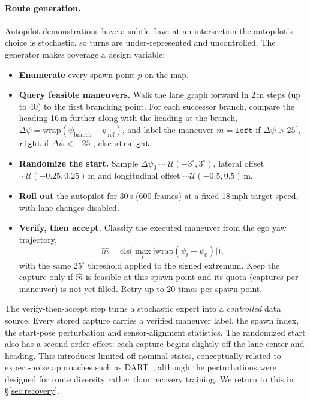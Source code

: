 \documentclass[11pt]{article}
\begin{document}
\paragraph{Route generation.} Autopilot demonstrations have a subtle flaw: at an intersection the autopilot's choice is stochastic, so turns are under-represented and uncontrolled. The generator makes coverage a design variable:
\begin{itemize}
  \item \textbf{Enumerate} every spawn point $p$ on the map.
  \item \textbf{Query feasible maneuvers.} Walk the lane graph forward in 2\,m steps (up to 40) to the first branching point. For each successor branch, compare the heading 16\,m further along with the heading at the branch, $\Delta\psi = \mathrm{wrap}(\psi_{\text{branch}} - \psi_{\text{ref}})$, and label the maneuver $m = \texttt{left}$ if $\Delta\psi > 25^\circ$, $\texttt{right}$ if $\Delta\psi < -25^\circ$, else $\texttt{straight}$.
  \item \textbf{Randomize the start.} Sample $\Delta\psi_0\sim\mathcal U(-3^\circ, 3^\circ)$, lateral offset $\sim\mathcal U(-0.25, 0.25)$\,m and longitudinal offset $\sim\mathcal U(-0.5, 0.5)$\,m.
  \item \textbf{Roll out} the autopilot for 30\,s (600 frames) at a fixed 18\,mph target speed, with lane changes disabled.
  \item \textbf{Verify, then accept.} Classify the executed maneuver from the ego yaw trajectory,
  \[ \hat m = \mathrm{cls}\Big(\max_t \big|\mathrm{wrap}(\psi_t - \psi_0)\big|\Big), \]
  with the same $25^\circ$ threshold applied to the signed extremum. Keep the capture only if $\hat m$ is feasible at this spawn point and its quota (captures per maneuver) is not yet filled. Retry up to 20 times per spawn point.
\end{itemize}

The verify-then-accept step turns a stochastic expert into a \emph{controlled} data source. Every stored capture carries a verified maneuver label, the spawn index, the start-pose perturbation and sensor-alignment statistics. The randomized start also has a second-order effect: each capture begins slightly off the lane center and heading. This introduces limited off-nominal states, conceptually related to expert-noise approaches such as DART~\cite{laskey2017dart}, although the perturbations were designed for route diversity rather than recovery training. We return to this in \S\ref{sec:recovery}.
\end{document}
